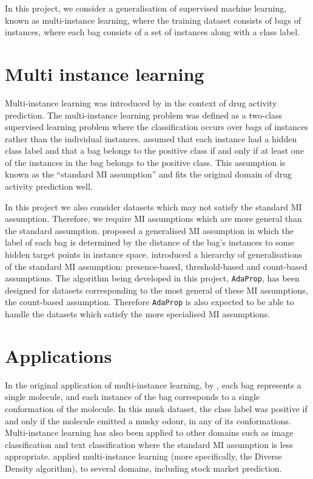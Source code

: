 \documentclass[a4paper,12pt]{report} %
\newcommand{\AdaProp}{\texttt{AdaProp}\xspace}
\begin{document}
In this project, we consider a generalisation of supervised machine learning, 
    known as multi-instance learning, 
    where the training dataset consists of bags of instances, 
    where each bag consists of a set of instances 
    along with a class label.

\section{Multi instance learning}

Multi-instance learning was introduced by  
    in the context of drug activity prediction. 
The multi-instance learning problem was 
    defined as a two-class supervised learning problem where 
    the classification occurs over bags of instances 
    rather than the individual instances. 
 assumed that each instance had a hidden class label and 
    that a bag belongs to the positive class if and only if 
    at least one of the instances in the bag belongs to the positive class. 
This assumption is known as the ``standard MI assumption'' and 
    fits the original domain of drug activity prediction well.

In this project we also consider datasets which may not satisfy the
    standard MI assumption. 
Therefore, we require MI assumptions which are more general than 
    the standard assumption.
 proposed a generalised MI assumption in which 
    the label of each bag is determined by the 
    distance of the bag's instances to some hidden target points in instance space.    
 introduced a hierarchy of generalisations of 
    the standard MI assumption: 
        presence-based, threshold-based and count-based assumptions.
The algorithm being developed in this project, \AdaProp, 
    has been designed for datasets corresponding to the 
    most general of these MI assumptions, 
    the count-based assumption.
Therefore \AdaProp is also expected to be able to handle
    the datasets which satisfy the more specialised MI assumptions.
        
\section{Applications}

In the original application of multi-instance learning, 
    by ,
    each bag represents a single molecule, 
    and each instance of the bag corresponds to a single conformation
    of the molecule.
In this musk dataset, the class label was positive if and only if 
    the molecule emitted a musky odour, in any of its conformations.
Multi-instance learning has also been applied to other domains 
    such as image classification and text classification where 
    the standard MI assumption is less appropriate.
 applied multi-instance learning 
    (more specifically, the Diverse Density algorithm),
    to several domains, including stock market prediction.
    
\end{document}
